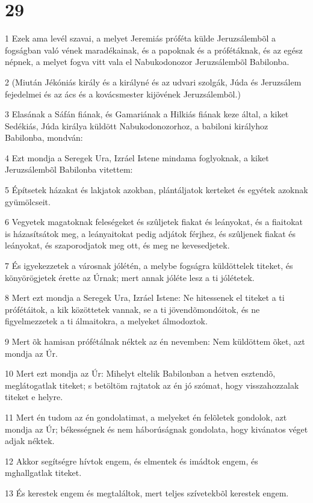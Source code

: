 \chapter{29}

\par 1 Ezek ama levél szavai, a melyet Jeremiás próféta külde Jeruzsálembõl a fogságban való vének maradékainak, és a papoknak és a prófétáknak, és az egész népnek, a melyet fogva vitt vala el Nabukodonozor Jeruzsálembõl Babilonba.
\par 2 (Miután Jékóniás király és a királyné és az udvari szolgák, Júda és Jeruzsálem fejedelmei és az ács és a kovácsmester kijövének Jeruzsálembõl.)
\par 3 Elasának a Sáfán fiának, és Gamariának a Hilkiás fiának keze által, a kiket Sedékiás, Júda királya küldött Nabukodonozorhoz, a babiloni királyhoz Babilonba, mondván:
\par 4 Ezt mondja a Seregek Ura, Izráel Istene mindama foglyoknak, a kiket Jeruzsálembõl Babilonba vitettem:
\par 5 Építsetek házakat és lakjatok azokban, plántáljatok kerteket és egyétek azoknak gyümölcseit.
\par 6 Vegyetek magatoknak feleségeket és szûljetek fiakat és leányokat, és a fiaitokat is házasítsátok meg, a leányaitokat pedig adjátok férjhez, és szûljenek fiakat és leányokat, és szaporodjatok meg ott, és meg ne kevesedjetek.
\par 7 És igyekezzetek a városnak jólétén, a melybe fogságra küldöttelek titeket, és könyörögjetek érette az Úrnak; mert annak jóléte lesz a ti jólétetek.
\par 8 Mert ezt mondja a Seregek Ura, Izráel Istene: Ne hitessenek el titeket a ti prófétáitok, a kik közöttetek vannak, se a ti jövendõmondóitok, és ne figyelmezzetek a ti álmaitokra, a melyeket álmodoztok.
\par 9 Mert õk hamisan prófétálnak néktek az én nevemben: Nem küldöttem õket, azt mondja az Úr.
\par 10 Mert ezt mondja az Úr: Mihelyt eltelik Babilonban a hetven esztendõ, meglátogatlak titeket; s betöltöm rajtatok az én jó szómat, hogy visszahozzalak titeket e helyre.
\par 11 Mert én tudom az én gondolatimat, a melyeket én felõletek gondolok, azt mondja az Úr; békességnek és nem háborúságnak gondolata, hogy kivánatos véget adjak néktek.
\par 12 Akkor segítségre hívtok engem, és elmentek és imádtok engem, és mghallgatlak titeket.
\par 13 És kerestek engem és megtaláltok, mert teljes szívetekbõl kerestek engem.

